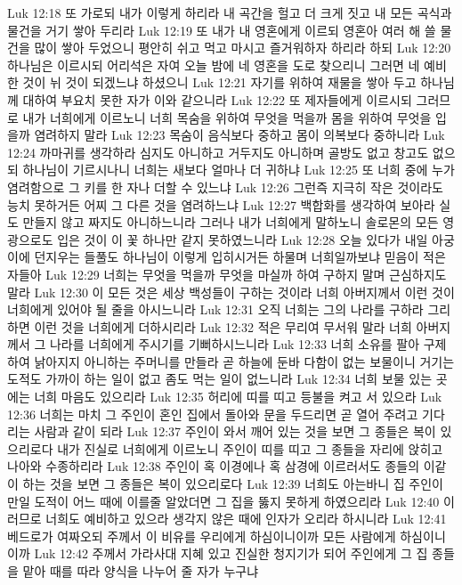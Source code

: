 Luk 12:18  또 가로되 내가 이렇게 하리라 내 곡간을 헐고 더 크게 짓고 내 모든 곡식과 물건을 거기 쌓아 두리라
Luk 12:19  또 내가 내 영혼에게 이르되 영혼아 여러 해 쓸 물건을 많이 쌓아 두었으니 평안히 쉬고 먹고 마시고 즐거워하자 하리라 하되
Luk 12:20  하나님은 이르시되 어리석은 자여 오늘 밤에 네 영혼을 도로 찾으리니 그러면 네 예비한 것이 뉘 것이 되겠느냐 하셨으니
Luk 12:21  자기를 위하여 재물을 쌓아 두고 하나님께 대하여 부요치 못한 자가 이와 같으니라
Luk 12:22  또 제자들에게 이르시되 그러므로 내가 너희에게 이르노니 너희 목숨을 위하여 무엇을 먹을까 몸을 위하여 무엇을 입을까 염려하지 말라
Luk 12:23  목숨이 음식보다 중하고 몸이 의복보다 중하니라
Luk 12:24  까마귀를 생각하라 심지도 아니하고 거두지도 아니하며 골방도 없고 창고도 없으되 하나님이 기르시나니 너희는 새보다 얼마나 더 귀하냐
Luk 12:25  또 너희 중에 누가 염려함으로 그 키를 한 자나 더할 수 있느냐
Luk 12:26  그런즉 지극히 작은 것이라도 능치 못하거든 어찌 그 다른 것을 염려하느냐
Luk 12:27  백합화를 생각하여 보아라 실도 만들지 않고 짜지도 아니하느니라 그러나 내가 너희에게 말하노니 솔로몬의 모든 영광으로도 입은 것이 이 꽃 하나만 같지 못하였느니라
Luk 12:28  오늘 있다가 내일 아궁이에 던지우는 들풀도 하나님이 이렇게 입히시거든 하물며 너희일까보냐 믿음이 적은 자들아
Luk 12:29  너희는 무엇을 먹을까 무엇을 마실까 하여 구하지 말며 근심하지도 말라
Luk 12:30  이 모든 것은 세상 백성들이 구하는 것이라 너희 아버지께서 이런 것이 너희에게 있어야 될 줄을 아시느니라
Luk 12:31  오직 너희는 그의 나라를 구하라 그리하면 이런 것을 너희에게 더하시리라
Luk 12:32  적은 무리여 무서워 말라 너희 아버지께서 그 나라를 너희에게 주시기를 기뻐하시느니라
Luk 12:33  너희 소유를 팔아 구제하여 낡아지지 아니하는 주머니를 만들라 곧 하늘에 둔바 다함이 없는 보물이니 거기는 도적도 가까이 하는 일이 없고 좀도 먹는 일이 없느니라
Luk 12:34  너희 보물 있는 곳에는 너희 마음도 있으리라
Luk 12:35  허리에 띠를 띠고 등불을 켜고 서 있으라
Luk 12:36  너희는 마치 그 주인이 혼인 집에서 돌아와 문을 두드리면 곧 열어 주려고 기다리는 사람과 같이 되라
Luk 12:37  주인이 와서 깨어 있는 것을 보면 그 종들은 복이 있으리로다 내가 진실로 너희에게 이르노니 주인이 띠를 띠고 그 종들을 자리에 앉히고 나아와 수종하리라
Luk 12:38  주인이 혹 이경에나 혹 삼경에 이르러서도 종들의 이같이 하는 것을 보면 그 종들은 복이 있으리로다
Luk 12:39  너희도 아는바니 집 주인이 만일 도적이 어느 때에 이를줄 알았더면 그 집을 뚫지 못하게 하였으리라
Luk 12:40  이러므로 너희도 예비하고 있으라 생각지 않은 때에 인자가 오리라 하시니라
Luk 12:41  베드로가 여짜오되 주께서 이 비유를 우리에게 하심이니이까 모든 사람에게 하심이니이까
Luk 12:42  주께서 가라사대 지혜 있고 진실한 청지기가 되어 주인에게 그 집 종들을 맡아 때를 따라 양식을 나누어 줄 자가 누구냐
